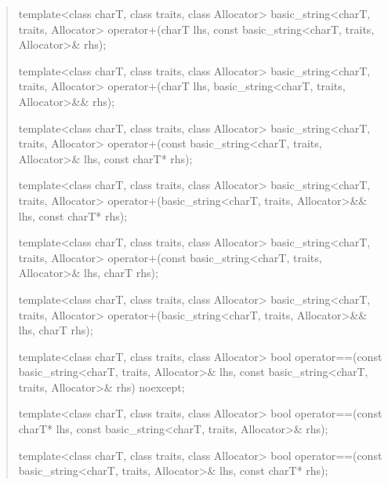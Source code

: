 \documentclass{wg21}
\begin{document}
\begin{quote}
\begin{itemdecl}
template<class charT, class traits, class Allocator>
  basic_string<charT, traits, Allocator>
    operator+(charT lhs, const basic_string<charT, traits, Allocator>& rhs);
\end{itemdecl}

\begin{itemdecl}
template<class charT, class traits, class Allocator>
  basic_string<charT, traits, Allocator>
    operator+(charT lhs, basic_string<charT, traits, Allocator>&& rhs);
\end{itemdecl}

\begin{itemdecl}
template<class charT, class traits, class Allocator>
  basic_string<charT, traits, Allocator>
    operator+(const basic_string<charT, traits, Allocator>& lhs, const charT* rhs);
\end{itemdecl}

\begin{itemdecl}
template<class charT, class traits, class Allocator>
  basic_string<charT, traits, Allocator>
    operator+(basic_string<charT, traits, Allocator>&& lhs, const charT* rhs);
\end{itemdecl}

\begin{itemdecl}
template<class charT, class traits, class Allocator>
  basic_string<charT, traits, Allocator>
    operator+(const basic_string<charT, traits, Allocator>& lhs, charT rhs);
\end{itemdecl}

\begin{itemdecl}
template<class charT, class traits, class Allocator>
  basic_string<charT, traits, Allocator>
    operator+(basic_string<charT, traits, Allocator>&& lhs, charT rhs);
\end{itemdecl}

\begin{itemdecl}
template<class charT, class traits, class Allocator>
  bool operator==(const basic_string<charT, traits, Allocator>& lhs,
                  const basic_string<charT, traits, Allocator>& rhs) noexcept;
\end{itemdecl}

\begin{itemdecl}
template<class charT, class traits, class Allocator>
  bool operator==(const charT* lhs, const basic_string<charT, traits, Allocator>& rhs);
\end{itemdecl}

\begin{itemdecl}
template<class charT, class traits, class Allocator>
  bool operator==(const basic_string<charT, traits, Allocator>& lhs, const charT* rhs);
\end{itemdecl}


\end{quote}
\end{document}
